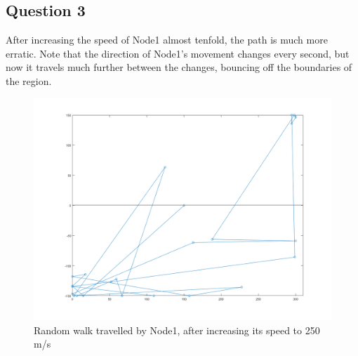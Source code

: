 \documentclass[11pt,journal]{article}
\begin{document}
	\pagebreak
	\subsection{Question 3}
	After increasing the speed of Node1 almost tenfold, the path is much more erratic. Note that the direction of Node1's movement changes every second, but now it travels much further between the changes, bouncing off the boundaries of the region.
	
	\begin{figure}[h]
		\centering
		\includegraphics[scale=0.5]{lab4ii_walk_matlab2.png}
		\caption{Random walk travelled by Node1, after increasing its speed to 250 m/s}
	\end{figure}
	
	

	
\end{document}
